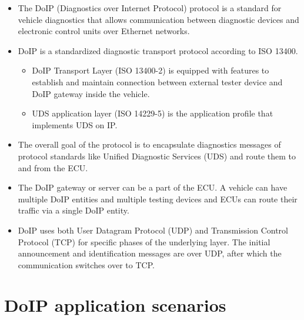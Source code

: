 \begin{itemize}

\item The DoIP (Diagnostics over Internet Protocol) protocol is a standard for vehicle diagnostics that allows communication 
between diagnostic devices and electronic control units over Ethernet networks.

\item DoIP is a standardized diagnostic transport protocol according to ISO 13400.
    \begin{itemize}

    \item DoIP Transport Layer (ISO 13400-2) is equipped with features to establish and maintain connection between external 
    tester device and DoIP gateway inside the vehicle.
    
    \item UDS application layer (ISO 14229-5) is the application profile that implements UDS on IP.

    \end{itemize}

\item The overall goal of the protocol is to encapsulate diagnostics messages of protocol standards like Unified Diagnostic Services (UDS)
and route them to and from the ECU.

\item The DoIP gateway or server can be a part of the ECU. A vehicle can have multiple DoIP entities and multiple testing devices and 
ECUs can route their traffic via a single DoIP entity. 

\item DoIP uses both User Datagram Protocol (UDP) and Transmission Control Protocol (TCP) for specific phases of the underlying layer. 
The initial announcement and identification messages are over UDP, after which the communication switches over to TCP.

\end{itemize}




\newpage
\section{DoIP application scenarios}


